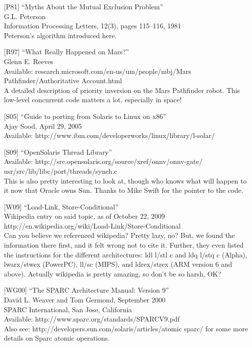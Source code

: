 {[}P81{]} ``Myths About the Mutual Exclusion Problem''\\
G.L. Peterson\\
Information Processing Letters, 12(3), pages 115--116, 1981\\
Peterson's algorithm introduced here.

{[}R97{]} ``What Really Happened on Mars?''\\
Glenn E. Reeves\\
Available: research.microsoft.com/en-us/um/people/mbj/Mars
Pathfinder/Authoritative Account.html\\
A detailed description of priority inversion on the Mars Pathfinder
robot. This low-level concurrent code matters a lot, especially in
space!

{[}S05{]} ``Guide to porting from Solaris to Linux on x86''\\
Ajay Sood, April 29, 2005\\
Available: http://www.ibm.com/developerworks/linux/library/l-solar/

{[}S09{]} ``OpenSolaris Thread Library''\\
Available: http://src.opensolaris.org/source/xref/onnv/onnv-gate/\\
usr/src/lib/libc/port/threads/synch.c\\
This is also pretty interesting to look at, though who knows what will
happen to it now that Oracle owns Sun. Thanks to Mike Swift for the
pointer to the code.

{[}W09{]} ``Load-Link, Store-Conditional''\\
Wikipedia entry on said topic, as of October 22, 2009\\
http://en.wikipedia.org/wiki/Load-Link/Store-Conditional\\
Can you believe we referenced wikipedia? Pretty lazy, no? But, we found
the information there first, and it felt wrong not to cite it. Further,
they even listed the instructions for the different architectures: ldl
l/stl c and ldq l/stq c (Alpha), lwarx/stwcx (PowerPC), ll/sc (MIPS),
and ldrex/strex (ARM version 6 and above). Actually wikipedia is pretty
amazing, so don't be so harsh, OK?

{[}WG00{]} ``The SPARC Architecture Manual: Version 9''\\
David L. Weaver and Tom Germond, September 2000\\
SPARC International, San Jose, California\\
Available: http://www.sparc.org/standards/SPARCV9.pdf\\
Also see: http://developers.sun.com/solaris/articles/atomic sparc/ for
some more details on Sparc atomic operations.

